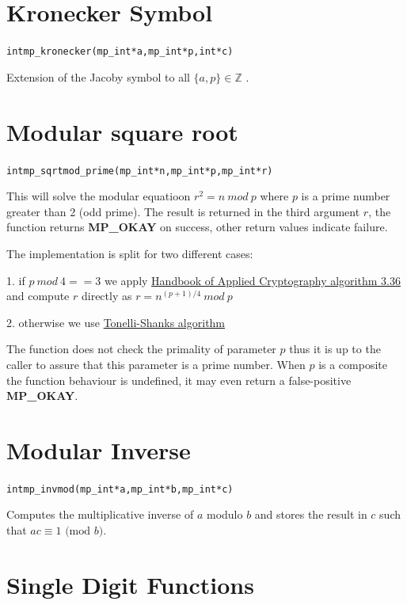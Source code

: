 \documentclass[synpaper]{book}
\def\mod{{\mathit\ mod\ }}
\begin{document}
\section{Kronecker Symbol}
\begin{alltt}
int mp_kronecker (mp_int * a, mp_int * p, int *c)
\end{alltt}
Extension of the Jacoby symbol to all $\lbrace a, p \rbrace \in \mathbb{Z}$ .

\section{Modular square root}
\begin{alltt}
int mp_sqrtmod_prime(mp_int *n, mp_int *p, mp_int *r)
\end{alltt}

This will solve the modular equatioon $r^2 = n \mod p$ where $p$ is a prime number greater than 2 (odd prime).
The result is returned in the third argument $r$, the function returns \textbf{MP\_OKAY} on success,
other return values indicate failure.

The implementation is split for two different cases:

1. if $p \mod 4 == 3$ we apply \href{http://cacr.uwaterloo.ca/hac/}{Handbook of Applied Cryptography algorithm 3.36} and compute $r$ directly as
$r = n^{(p+1)/4} \mod p$

2. otherwise we use \href{https://en.wikipedia.org/wiki/Tonelli-Shanks_algorithm}{Tonelli-Shanks algorithm}

The function does not check the primality of parameter $p$ thus it is up to the caller to assure that this parameter
is a prime number. When $p$ is a composite the function behaviour is undefined, it may even return a false-positive
\textbf{MP\_OKAY}.

\section{Modular Inverse}
\begin{alltt}
int mp_invmod (mp_int * a, mp_int * b, mp_int * c)
\end{alltt}
Computes the multiplicative inverse of $a$ modulo $b$ and stores the result in $c$ such that $ac \equiv 1 \mbox{ (mod }b\mbox{)}$.

\section{Single Digit Functions}
\end{document}

